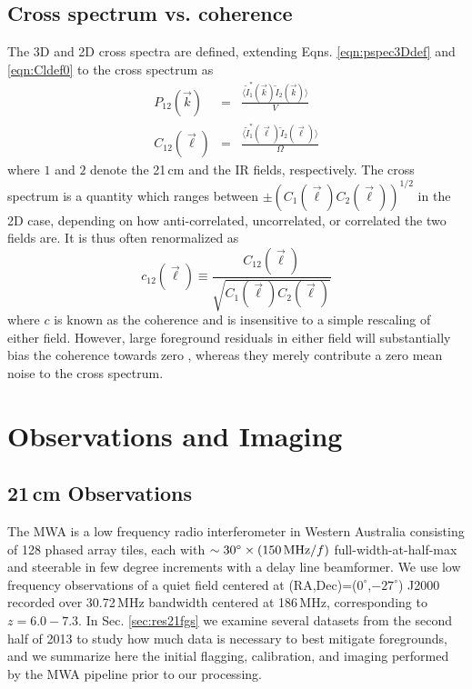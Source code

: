 \documentclass{emulateapj}
\begin{document}
\subsection{Cross spectrum vs. coherence}

The 3D and 2D cross spectra are defined, extending Eqns. \ref{eqn:pspec3Ddef} and \ref{eqn:Cldef0} to the cross spectrum as
\begin{eqnarray}
	P_{12}(\vec{k}) &=& \frac{\langle\tilde{I}_1^*(\vec{k})\tilde{I}_2(\vec{k})\rangle}{V}\\
	C_{12}(\vec{\ell}) &=& \frac{\langle \tilde{I}_1^*(\vec{\ell})\tilde{I}_2(\vec{\ell})\rangle}{\Omega}
\end{eqnarray}
where $1$ and $2$ denote the 21\,cm and the IR fields, respectively. The cross spectrum is a quantity which ranges between $\pm(C_{1}(\vec{\ell})C_{2}(\vec{\ell}))^{1/2}$ in the 2D case, depending on how anti-correlated, uncorrelated, or correlated the two fields are. It is thus often renormalized as  
\begin{equation}
\label{eqn:Cldefcross}
	c_{12}(\vec{\ell}) \equiv \frac{C_{12}(\vec{\ell}) }{\sqrt{C_1(\vec{\ell})  C_2(\vec{\ell}) }}
\end{equation}
where $c$ is known as the coherence and is insensitive to a simple rescaling of either field. However, large foreground residuals in either field will substantially bias the coherence towards zero \citep{lidz09,furlanettolidz07}, whereas they merely contribute a zero mean noise to the cross spectrum. 

\section{Observations and Imaging}
\subsection{21\,cm Observations}
\label{sec:mwaobservations}

The MWA is a low frequency radio interferometer in Western Australia consisting of 128 phased array tiles, each with $\sim30^\circ\times(150\text{\,MHz}/f)$ full-width-at-half-max and steerable in few degree increments with a delay line beamformer. We use low frequency observations of a quiet field centered at (RA,Dec)=($0^\circ$,$-27^\circ$) J2000 recorded over 30.72\,MHz bandwidth centered at 186\,MHz, corresponding to $z=6.0-7.3$. In Sec. \ref{sec:res21fgs} we examine several datasets from the second half of 2013 to study how much data is necessary to best mitigate foregrounds, and we summarize here the initial flagging, calibration, and imaging performed by the MWA pipeline prior to our processing. 
\end{document}
